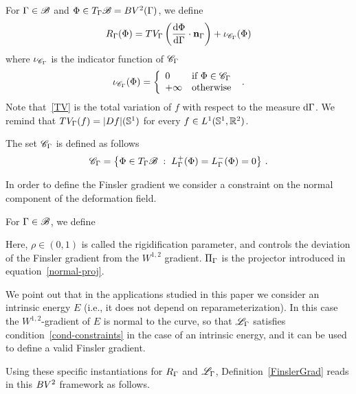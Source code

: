\begin{defn}\label{defn1}
	For $\Gamma \in \mathcal{B}$ and $\Phi \in T_\Gamma\mathcal{B} = BV^{2}(\Gamma)$, we define
	\begin{equation}\label{eq-piecewise-rigid-penalty}	
		R_\Gamma(\Phi) =
			TV_\Gamma\left(\frac{\mathrm{d} \Phi}{\mathrm{d}\Gamma}\cdot \mathbf{n}_\Gamma\right)
			 + \iota_{\mathcal{C}_\Gamma}(\Phi)
	\end{equation}
where $\iota_{\mathcal{C}_\Gamma}$ is the indicator  function of $\mathcal{C}_\Gamma$ 
$$
\displaystyle{\iota_{\mathcal{C}_\Gamma}(\Phi)=
\left\{
\begin{array} {ll}
0 &\text{if } \Phi \in \mathcal{C}_\Gamma\\
+\infty &\text{otherwise }  
\end{array}\right.}
\,.$$
Note that~\eqref{TV} is the total variation of $f$ with respect to the measure $\mathrm{d}\Gamma$. We remind  that $TV_\Gamma(f)=|Df|(\mathbb{S}^1)$ for every $f\in L^1(\mathbb{S}^1,\mathbb{R}^2)$.
\par The set $\mathcal{C}_\Gamma$ is defined as follows
\begin{equation}\label{eq-constr-C-Ga}
	\mathcal{C}_\Gamma = \left\{ \Phi\in T_\Gamma\mathcal{B}  \;:\; L^+_\Gamma(\Phi)=L^-_\Gamma(\Phi)=0  \right\}\,.
\end{equation}
\end{defn}
In order to define the Finsler gradient  we consider a constraint on the normal component of the deformation field.

\begin{defn}\label{defn-dev-constr} For $\Gamma \in \mathcal{B}$, we define
\end{defn}

Here, $\rho\in (0,1)$ is called the rigidification parameter, and controls the deviation of the Finsler gradient from the $W^{1,2}$ gradient. $\Pi_\Gamma$ is the projector introduced in equation~\eqref{normal-proj}.
\par We point out that in the applications studied in this paper we consider an intrinsic energy $E$ (i.e., it does not depend on reparameterization). In this case  the $W^{1,2}$-gradient of $E$ is normal to the curve, so that  $\mathcal{L}_\Gamma$ satisfies condition~\eqref{cond-constraints} in the case of an intrinsic energy, and  it can be used to define a valid Finsler gradient. 




 Using these specific instantiations for $R_\Gamma$ and $\mathcal{L}_\Gamma$, Definition~\ref{FinslerGrad} reads in this $BV^{2}$ framework as follows.

